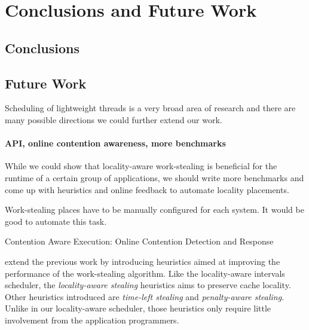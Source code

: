 
\chapter{Conclusions and Future Work}
\label{chap:locality-conclusions}

\section{Conclusions}
\label{sec:locality-conclusions-and-future-work-conclusions}



\section{Future Work}
\label{sec:locality-conclusions-and-future-work-future-work}

Scheduling of lightweight threads is a very broad area of research and
there are many possible directions we could further extend our work.

\subsubsection{API, online contention awareness, more benchmarks}

While we could show that locality-aware work-stealing is beneficial
for the runtime of a certain group of applications, we should write
more benchmarks and come up with heuristics and online feedback to
automate locality placements.

Work-stealing places have to be manually configured for each
system. It would be good to automate this task.

\textcite{Mars2010} Contention Aware Execution: Online Contention
Detection and Response

\textcite{Gaud2010} extend the previous work by introducing heuristics
aimed at improving the performance of the work-stealing
algorithm. Like the locality-aware intervals scheduler, the
\emph{locality-aware stealing} heuristics aims to preserve cache
locality. Other heuristics introduced are \emph{time-left stealing}
and \emph{penalty-aware stealing}. Unlike in our locality-aware
scheduler, those heuristics only require little involvement from the
application programmers.

